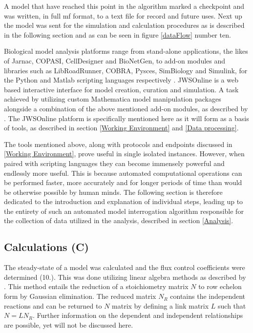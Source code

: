 A model that have reached this point in the algorithm marked a checkpoint and was written, in full mf format, to a text file for record and future uses. Next up the model was sent for the simulation and calculation procedures as is described in the following section and as can be seen in figure \ref{dataFlow} number ten.


Biological model analysis platforms range from stand-alone applications, the likes of Jarnac, COPASI, CellDesigner and BioNetGen, to  add-on modules and libraries such as LibRoadRunner, COBRA, Pysces, SimBiology and Simulink, for the Python and Matlab scripting languages respectively \cite{Sauro2000, Hoops2006, Olivier2005, Somogyi2015, Harris2016, Laurent2017}. JWSOnline is a web based interactive interface for model creation, curation and simulation. A task achieved by utilizing custom Mathematica model manipulation packages alongside a combination of the above mentioned add-on modules, as described by \cite{Olivier2004, jwsdocs}. The JWSOnline platform is specifically mentioned here as it will form as a basis of tools, as described in section \ref{Working Environment} and \ref{Data processing}. 

The tools mentioned above, along with protocols and endpoints discussed in \ref{Working Environment}, prove useful in single isolated instances. However, when paired with scripting languages they can become immensely powerful and endlessly more useful. This is because automated computational operations can be performed faster, more accurately and for longer periods of time than would be otherwise possible by human minds. The following section is therefore dedicated to the introduction and explanation of individual steps, leading up to the entirety of such an automated model interrogation algorithm responsible for the collection of data utilized in the analysis, described in section \ref{Analysis}. 










\subsection{Calculations (C)} \label{Calculations}
The \gls{steady-state} of a model was calculated and the flux control coefficients were determined (10.). This was done utilizing linear algebra methods as described by \citeauthor{Hofmeyr2001}. This method entails the reduction of a stoichiometry matrix $N$ to row echelon form by Gaussian elimination. The reduced matrix $N_R$ contains the independent reactions and can be returned to $N$ matrix by defining a link matrix $L$ such that $N = LN_R$. Further information on the dependent and independent relationships are possible, yet will not be discussed here. 

